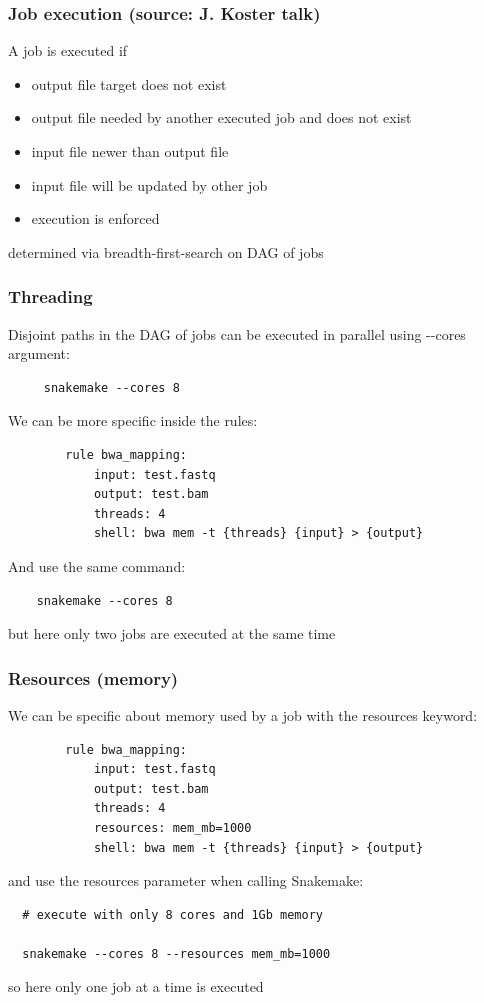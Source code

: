 \documentclass{beamer}
\begin{document}

\begin{frame}
\frametitle{Job execution \tiny{(source: J. Koster talk)}}
 A job is executed if
 \begin{itemize}
 \item  output file target does not exist
 \item  output file needed by another executed job and does not exist
 \item  input file newer than output file
 \item  input file will be updated by other job
 \item  execution is enforced
\end{itemize}
determined via breadth-first-search on DAG of jobs 
\end{frame}





\begin{frame}[fragile]
\frametitle{Threading}
Disjoint paths in the DAG of jobs can be executed in parallel using -\--cores 
argument:
\begin{lstlisting}
     snakemake --cores 8
\end{lstlisting}
We can be more specific inside the rules:
\begin{lstlisting}
        rule bwa_mapping:
            input: test.fastq
            output: test.bam
            threads: 4 
            shell: bwa mem -t {threads} {input} > {output}
\end{lstlisting}
 And use the same command:
 \begin{lstlisting}
    snakemake --cores 8
 \end{lstlisting}
 but here only two jobs are executed at the same time
\end{frame}
 
 
\begin{frame}[fragile]
\frametitle{Resources (memory)}
We can be specific about memory used by a job with the resources keyword:
\begin{lstlisting}
        rule bwa_mapping:
            input: test.fastq
            output: test.bam
            threads: 4 
            resources: mem_mb=1000
            shell: bwa mem -t {threads} {input} > {output}
 \end{lstlisting}
  
and use the resources parameter when calling Snakemake:  
  \begin{lstlisting}
  # execute with only 8 cores and 1Gb memory
  
  snakemake --cores 8 --resources mem_mb=1000
  \end{lstlisting}   
  
  so here only one job at a time is executed
  
\end{frame}
 
\end{document}
